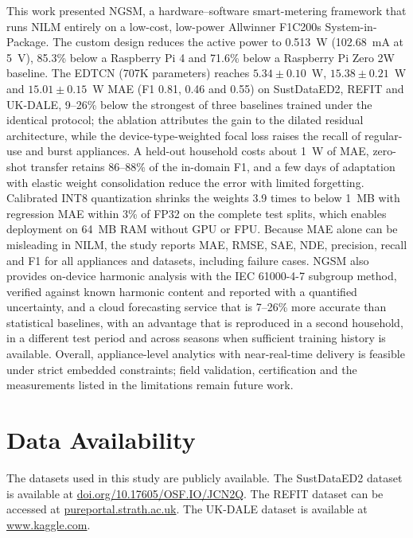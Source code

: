 \documentclass[fleqn,10pt]{wlscirep}
\begin{document}
This work presented NGSM, a hardware--software smart-metering framework that runs NILM entirely on a low-cost, low-power Allwinner F1C200s System-in-Package. The custom design reduces the active power to 0.513~W (102.68~mA at 5~V), 85.3\% below a Raspberry Pi 4 and 71.6\% below a Raspberry Pi Zero 2W baseline. The EDTCN (707K parameters) reaches $5.34\pm0.10$~W, $15.38\pm0.21$~W and $15.01\pm0.15$~W MAE (F1 0.81, 0.46 and 0.55) on SustDataED2, REFIT and UK-DALE, 9--26\% below the strongest of three baselines trained under the identical protocol; the ablation attributes the gain to the dilated residual architecture, while the device-type-weighted focal loss raises the recall of regular-use and burst appliances. A held-out household costs about 1~W of MAE, zero-shot transfer retains 86--88\% of the in-domain F1, and a few days of adaptation with elastic weight consolidation reduce the error with limited forgetting. Calibrated INT8 quantization shrinks the weights 3.9 times to below 1~MB with regression MAE within 3\% of FP32 on the complete test splits, which enables deployment on 64~MB RAM without GPU or FPU. Because MAE alone can be misleading in NILM, the study reports MAE, RMSE, SAE, NDE, precision, recall and F1 for all appliances and datasets, including failure cases. NGSM also provides on-device harmonic analysis with the IEC 61000-4-7 subgroup method, verified against known harmonic content and reported with a quantified uncertainty, and a cloud forecasting service that is 7--26\% more accurate than statistical baselines, with an advantage that is reproduced in a second household, in a different test period and across seasons when sufficient training history is available. Overall, appliance-level analytics with near-real-time delivery is feasible under strict embedded constraints; field validation, certification and the measurements listed in the limitations remain future work.




\section*{Data Availability}
The datasets used in this study are publicly available. The SustDataED2 dataset is available at \href{https://doi.org/10.17605/OSF.IO/JCN2Q}{doi.org/10.17605/OSF.IO/JCN2Q}. The REFIT dataset can be accessed at \href{https://pureportal.strath.ac.uk/en/datasets/refit-electrical-load-measurements}{pureportal.strath.ac.uk}. The UK-DALE dataset is available at \href{https://www.kaggle.com/datasets/cyy233/ukdale-2017}{www.kaggle.com}.
\end{document}
